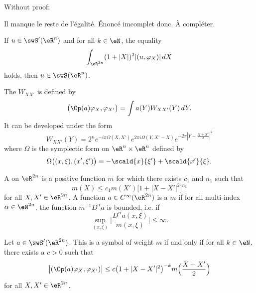 Without proof:
\begin{probleme}
Il manque le reste de l'égalité. Énoncé imcomplet donc. À compléter.
\end{probleme}

\begin{proposition}
If $u\in\swS'(\eR^n)$ and for all $k\in\eN$, the equality
\[
  \int_{\eR^{2n}} (1+| X |)^2 | (u,\varphi_X) |\,dX
\]
holds, then $u\in\swS(\eR^n)$.
\end{proposition}

The  $W_{XX'}$ is defined by
\begin{equation}
  \big( \Op(a)\varphi_X,\varphi_{X'} \big)=\int a(Y)W_{XX'}(Y)\,dY.
\end{equation}
It can be developed under the form
\begin{equation}
  W_{XX'}(Y)=2^n e^{-i\pi\Omega(X,X')} e^{2\pi i\Omega(Y,X'-X)} e^{-2\pi\left|  Y-\frac{ X+X' }{ 2 }  \right|^2}
\end{equation}
where $\Omega$ is the symplectic form on $\eR^n\times\eR^n$ defined by
\[
  \Omega\big( (x,\xi),(x',\xi') \big)=-\scald{ x }{ \xi' }+\scald{ x' }{ \xi }.
\]

A  on $\eR^{2n}$ is a positive function $m$ for which there exists $c_1$ and $n_1$ such that
\[
  m(X)\leq c_1m(X')\big[ 1+| X-X' |^2 \big]^{n_1}
\]
for all $X,X'\in\eR^{2n}$. A function $a\in C^{\infty}(\eR^{2n})$ is a  $m$ if  for all multi-index $\alpha\in\eN^{2n}$, the function $m^{-1}D^{\alpha}a$ is bounded, i.e. if
\[
  \sup_{(x,\xi)}\Big|  \frac{ D^{\alpha}a(x,\xi) }{ m(x,\xi) } \Big|\leq\infty.
\]


\begin{theorem}
   Let $a\in\swS'(\eR^{2n})$. This is a symbol of weight $m$ if and only if for all $k\in\eN$, there exists a $c>0$ such that
\[
  \big|  (\Op(a)\varphi_X,\varphi_{X'})  \big|\leq c\big( 1+| X-X' |^2 \big)^{-k}m\Big( \frac{ X+X' }{2} \Big)
\]
for all $X,X'\in\eR^{2n}$.
\end{theorem}
